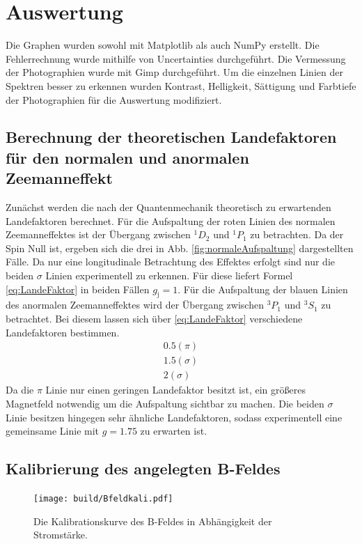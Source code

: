 \section{Auswertung}
\label{sec:Auswertung}
Die Graphen wurden sowohl mit Matplotlib \cite{matplotlib} als auch NumPy \cite{numpy} erstellt. Die
Fehlerrechnung wurde mithilfe von Uncertainties \cite{uncertainties} durchgeführt. Die Vermessung der Photographien wurde mit Gimp \cite{gimp} durchgeführt. Um die einzelnen Linien der Spektren besser zu erkennen wurden Kontrast, Helligkeit, Sättigung und Farbtiefe der Photographien für die Auswertung modifiziert.%



\subsection{Berechnung der theoretischen Landefaktoren für den normalen und anormalen Zeemanneffekt}
Zunächst werden die nach der Quantenmechanik theoretisch zu erwartenden Landefaktoren berechnet. Für die Aufspaltung der roten Linien des normalen Zeemanneffektes ist der Übergang zwischen $^1 D_2$ und $^1 P_1$ zu betrachten.
 Da der Spin Null ist, ergeben sich die drei in Abb. \ref{fig:normaleAufspaltung} dargestellten Fälle. Da nur eine longitudinale Betrachtung des Effektes erfolgt sind nur die beiden $\sigma$ Linien experimentell zu erkennen. Für diese liefert Formel \eqref{eq:LandeFaktor} in beiden Fällen $g_\text{j} = 1$.
Für die Aufspaltung der blauen Linien des anormalen Zeemanneffektes wird der Übergang zwischen $^3 P_1$ und $^3 S_1$ zu betrachtet. Bei diesem lassen sich über \eqref{eq:LandeFaktor} verschiedene Landefaktoren bestimmen. 
\begin{gather}
	0.5 (\pi)\\
	1.5 (\sigma)\\
	2 (\sigma)
\end{gather}
Da die $\pi$ Linie nur einen geringen Landefaktor besitzt ist, ein größeres Magnetfeld notwendig um die Aufspaltung sichtbar zu machen. Die beiden $\sigma$ Linie besitzen hingegen sehr ähnliche Landefaktoren, sodass experimentell eine gemeinsame Linie mit $g= 1.75$ zu erwarten ist.

\subsection{Kalibrierung des angelegten B-Feldes}

\begin{figure}
	\centering
	\texttt{[image: build/Bfeldkali.pdf]}
	\caption{Die Kalibrationskurve des B-Feldes in Abhängigkeit der Stromstärke.}
	\label{fig:BvonI}
\end{figure}


